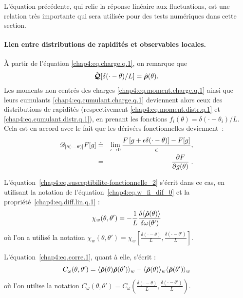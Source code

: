 L'équation précédente, qui relie la réponse linéaire aux fluctuations, est une relation très importante qui sera utilisée pour des tests numériques dans cette section.

\paragraph{Lien entre distributions de rapidités et observables locales.}

À partir de l’équation \eqref{chap4:eq.charge.q.1}, on remarque que 
\begin{eqnarray}
	\hat{\bm{\mathcal{Q}}}[\delta(\cdot - \theta)/L] = \hat{\bm{\rho}}(\theta).
\end{eqnarray}
Les moments non centrés des charges \eqref{chap4:eq.moment.charge.q.1} ainsi que leurs cumulants \eqref{chap4:eq.cumulant.charge.q.1} deviennent alors ceux des distributions de rapidités (respectivement \eqref{chap4:eq.moment.distr.q.1} et \eqref{chap4:eq.cumulant.distr.q.1}), en prenant les fonctions $f_i(\theta) = \delta(\cdot - \theta_i)/L$.\\

Cela est en accord avec le fait que les dérivées fonctionnelles deviennent :
\begin{eqnarray}\label{chap4:eq.w_fi_dif_0}
	\mathscr{D}_{[\delta(\cdot - \theta)]} F[g] &\doteq& \lim_{\epsilon \to 0} \frac{F\left[g + \epsilon \delta(\cdot - \theta)\right] - F[g]}{\epsilon}, \\
	& = & \left. \frac{\partial F}{\partial g(\theta)} \right. .
\end{eqnarray}



L’équation~\eqref{chap4:eq.susceptibilite-fonctionnelle_2} s’écrit dans ce cas, en utilisant la notation de l’équation~\eqref{chap4:eq.w_fi_dif_0} et la propriété~\eqref{chap4:eq.diff.lin.q.1} :
\begin{equation}
	\chi_w(\theta, \theta') = -\frac{1}{L} \frac{\delta \langle \hat{\bm{\rho}}(\theta) \rangle}{\delta \omega(\theta')} 
\end{equation}
où l’on a utilisé la notation $\chi_w(\theta, \theta') = \chi_w\left[\frac{\delta(\cdot - \theta)}{L}, \frac{\delta(\cdot - \theta')}{L} \right]$.

L’équation~\eqref{chap4:eq.corre.1}, quant à elle, s’écrit :
\begin{equation}
C_\omega(\theta, \theta') = \langle \hat{\bm{\rho}}(\theta) \hat{\bm{\rho}}(\theta') \rangle_w - \langle \hat{\bm{\rho}}(\theta) \rangle_w \langle \hat{\bm{\rho}}(\theta') \rangle_w 
\end{equation}
où l’on utilise la notation $C_\omega(\theta, \theta') = C_\omega\left( \frac{\delta(\cdot - \theta)}{L}, \frac{\delta(\cdot - \theta')}{L} \right)$.

